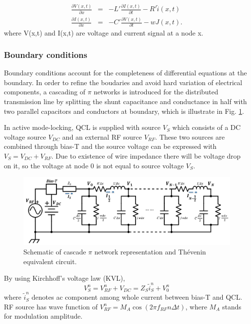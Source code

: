 \documentclass[11pt,final]{scrbook}
\begin{document}
\begin{eqnarray}
\frac { \partial V(x,t) }{ \partial x }  &=& -L'\frac { \partial I(x,t) }{ \partial t }-R'\tilde i(x,t) \label{eq:TLequation5}\\
\frac { \partial I(x,t) }{ \partial x }  &=& - C'\frac { \partial V(x,t) }{ \partial t }-wJ(x,t). \label{eq:TLequation6}
\end{eqnarray}
where V(x,t) and I(x,t) are voltage and current signal at a node x. 
\subsubsection{Boundary conditions}
Boundary conditions account for the completeness of differential equations at the boundary. In order to refine the boudaries and avoid hard variation of electrical components, a cascading of $\pi$ networks\cite{orlandi1996fdtd} is introduced for the distributed transmission line by splitting the shunt capacitance and conductance in half with two parallel capacitors and conductors at boundary, which is illustrate in Fig. \ref{fig:BoundaryCondition}. 

In active mode-locking, QCL is supplied with source $ {V}_{S} $ which consists of a DC voltage source $ {V}_{DC} $ and an external RF source $ {V}_{RF} $. These two sources are combined through bias-T and the source voltage can be expressed with $ {V}_{S}=V_{DC}+{V}_{RF} $. Due to existence of wire impedance there will be voltage drop on it, so the voltage at node 0 is not equal to source voltage $ {V}_{S} $.
\begin{figure}[htbp]
\begin{center}
\includegraphics[scale=0.6]{images/pi_representation.pdf}
\caption{Schematic of cascade $\pi$ network representation and Thévenin equivalent circuit. }
\label{fig:BoundaryCondition}
\end{center}
\end{figure}

By using Kirchhoff's voltage law (KVL), 
\begin{equation}
V_{S}^{n}={ V }_{ RF }^{n}+{V}_{DC} = {Z}_{S}\widetilde{ i }_{ S }^{ n } + {V}_{0}^{n} \label{eq:Vs_n}
\end{equation}
where $\widetilde{ i }_{ S }^{ n }$ denotes ac component among whole current between bias-T and QCL. RF source has wave function of $V_{RF}^{n}=M_{A}\cos(2\pi f_{RF}n\Delta t)$, where $M_{A}$ stands for modulation amplitude. 
\end{document}
